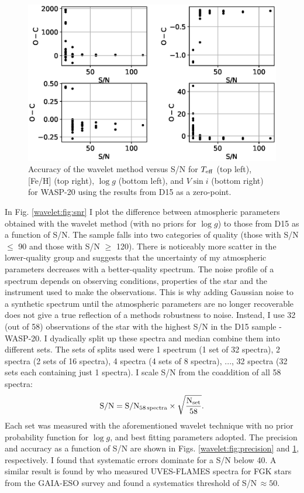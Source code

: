 \begin{figure}[ht!]
\centering
\includegraphics[width=\textwidth]{5-images/accuracy.eps}
\caption{Accuracy of the wavelet method versus S/N for $T_{\rm eff}$ (top left), [Fe/H] (top right), $\log g$ (bottom left), and $V \sin i$ (bottom right) for WASP-20 using the results from D15 as a zero-point.}
\label{wavelet:fig:accuracy}
\end{figure}

In Fig. \ref{wavelet:fig:snr} I plot the difference between atmospheric parameters obtained with the wavelet method (with no priors for $\log g$) to those from D15 as a function of S/N. The sample falls into two categories of quality (those with S/N $\leq$ 90 and those with S/N $\geq$ 120). There is noticeably more scatter in the lower-quality group and suggests that the uncertainty of my atmospheric parameters decreases with a better-quality spectrum. The noise profile of a spectrum depends on observing conditions, properties of the star and the instrument used to make the observations. This is why adding Gaussian noise to a synthetic spectrum until the atmospheric parameters are no longer recoverable does not give a true reflection of a methods robustness to noise. Instead, I use 32 (out of 58) observations of the star with the highest S/N in the D15 sample - WASP-20. I dyadically split up these spectra and median combine them into different sets. The sets of splits used were 1 spectrum (1 set of 32 spectra), 2 spectra (2 sets of 16 spectra), 4  spectra (4 sets of 8 spectra), ..., 32 spectra (32 sets each containing just 1 spectra). I scale S/N from the coaddition of all 58 spectra:
\begin{equation}
\rm S/N = \rm S/N_{58 \, \rm spectra} \times \sqrt{\frac{N_{\rm set}}{58}}.
\end{equation}
Each set was measured with the aforementioned wavelet technique with no prior probability function for $\log g$, and best fitting parameters adopted. The precision and accuracy as a function of S/N are shown in Figs. \ref{wavelet:fig:precision} and \ref{wavelet:fig:accuracy}, respectively. I found that systematic errors dominate for a S/N below 40. A similar result is found by \citet{2014A&A...570A.122S} who measured UVES-FLAMES spectra for FGK stars from the GAIA-ESO survey and found a systematics threshold of S/N$\, \approx 50$.



